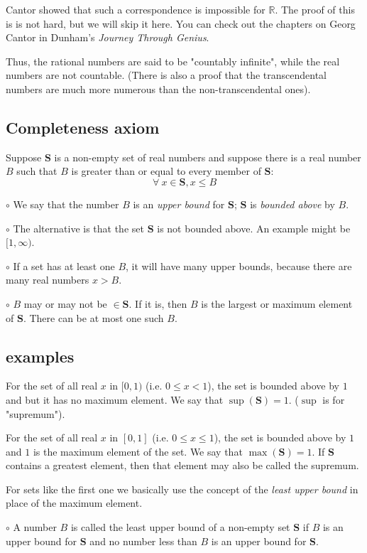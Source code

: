 \documentclass[11pt, oneside]{article}   	%
\begin{document}
Cantor showed that such a correspondence is impossible for $\mathbb{R}$.  The proof of this is is not hard, but we will skip it here.  You can check out the chapters on Georg Cantor in Dunham's \emph{Journey Through Genius}.

Thus, the rational numbers are said to be "countably infinite", while the real numbers are not countable.  (There is also a proof that the transcendental numbers are much more numerous than the non-transcendental ones).

\subsection*{Completeness axiom}
Suppose $\mathbf{S}$ is a non-empty set of real numbers and suppose there is a real number $B$ such that $B$ is greater than or equal to every member of $\mathbf{S}$:
\[ \forall \ x \in \mathbf{S}, x \le B \]

$\circ$  We say that the number $B$ is an \emph{upper bound} for $\mathbf{S}$;   $\mathbf{S}$ is \emph{bounded above} by $B$.  

$\circ$  The alternative is that the set $\mathbf{S}$ is not bounded above.  An example might be $[1,\infty)$.

$\circ$  If a set has at least one $B$, it will have many upper bounds, because there are many real numbers  $x > B$.

$\circ$  $B$ may or may not be $\in \mathbf{S}$.  If it is, then $B$ is the largest or maximum element of $\mathbf{S}$.  There can be at most one such $B$.

\subsection*{examples}
For the set of all real $x$ in $[0,1)$ (i.e. $0 \le x < 1$), the set is bounded above by $1$ and but it has no maximum element.  We say that $\sup(\mathbf{S}) = 1$.  ($\sup$ is for "supremum").

For the set of all real $x$ in $[0,1]$ (i.e. $0 \le x \le 1$), the set is bounded above by $1$ and $1$ is the maximum element of the set.  We say that $\max(\mathbf{S}) = 1$.  If $\mathbf{S}$ contains a greatest element, then that element may also be called the supremum.

For sets like the first one we basically use the concept of the \emph{least upper bound} in place of the maximum element.

$\circ$  A number $B$ is called the least upper bound of a non-empty set $\mathbf{S}$ if $B$ is an upper bound for $\mathbf{S}$ and no number less than $B$ is an upper bound for $\mathbf{S}$.
\end{document}
